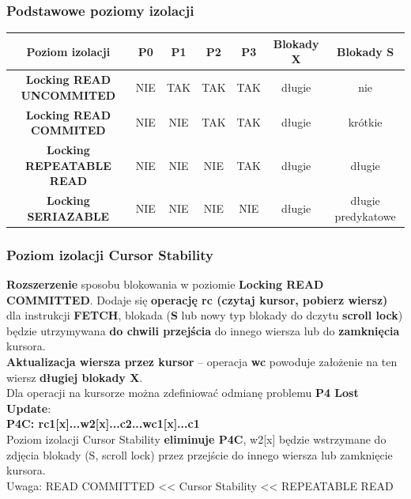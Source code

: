\documentclass[a4paper]{article}
\begin{document}
    \subsubsection{Podstawowe poziomy izolacji}
    \begin{tabular}{|c||c|c|c|c|c|c| }
        \hline
        \textbf{Poziom izolacji} & \textbf{P0} & \textbf{P1} & \textbf{P2} & \textbf{P3} & Blokady \textbf{X} & Blokady \textbf{S} \\
        \hline
        \hline
        \textbf{Locking READ UNCOMMITED} & NIE & TAK & TAK & TAK & długie & nie \\
        \hline
        \textbf{Locking READ COMMITED} & NIE & NIE & TAK & TAK & długie & krótkie\\
        \hline
        \textbf{Locking REPEATABLE READ} & NIE & NIE & NIE & TAK & długie & długie\\
        \hline
        \textbf{Locking SERIAZABLE} & NIE & NIE & NIE & NIE & długie & długie predykatowe\\
        \hline
    \end{tabular}

    \subsubsection{Poziom izolacji Cursor Stability}
    \textbf{Rozszerzenie} sposobu blokowania w poziomie \textbf{Locking READ COMMITTED}. Dodaje się \textbf{operację
    rc (czytaj kursor, pobierz wiersz)} dla instrukcji \textbf{FETCH}, blokada (\textbf{S} lub nowy typ blokady do
    dczytu \textbf{scroll lock}) będzie utrzymywana \textbf{do chwili przejścia} do innego wiersza lub do
    \textbf{zamknięcia} kursora.\\

    \textbf{Aktualizacja wiersza przez kursor} – operacja \textbf{wc} powoduje założenie na ten wiersz \textbf{długiej blokady X}.\\

    Dla operacji na kursorze można zdefiniować odmianę problemu \textbf{P4 Lost Update}:\\
    \textbf{P4C: rc1[x]...w2[x]...c2...wc1[x]...c1}\\

    Poziom izolacji Cursor Stability \textbf{eliminuje P4C}, w2[x] będzie wstrzymane do zdjęcia blokady (S, scroll lock) przez przejście do innego wiersza lub zamknięcie kursora.\\
    Uwaga: READ COMMITTED << Cursor Stability << REPEATABLE READ
\end{document}
